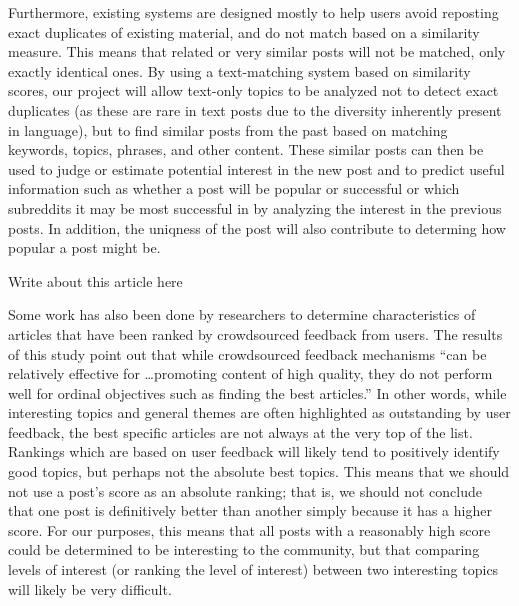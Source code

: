 \documentclass{acm_proc_article-sp}
\begin{document}
Furthermore, existing systems are designed mostly to help users avoid reposting exact duplicates of
existing material, and do not match based on a similarity measure.  This means that related or
very similar posts will not be matched, only exactly identical ones.  By using a text-matching system based
on similarity scores,
our project will allow text-only topics to be analyzed not to detect exact duplicates (as these
are rare in text posts due to the diversity inherently present in language), but to find similar
posts from the past based on matching keywords, topics, phrases, and other
content.  These similar posts can then be used to judge or estimate potential interest in the new
post and to predict useful information such as whether a post will be popular or successful or
which subreddits it may be most successful in by analyzing the interest in the previous posts. 
In addition, the uniqness of the post will also contribute to determing how popular a post might be.

Write about this article here \cite{liu:interest}

Some work has also been done by researchers to determine characteristics of articles that
have been ranked by crowdsourced feedback from users.\cite{askalidis:crowdsourced}
The results of this study point out that while crowdsourced feedback mechanisms ``can be
relatively effective for \ldots promoting content of high quality, they do not perform well
for ordinal objectives such as finding the best articles.''  In other words, while interesting
topics and general themes are often highlighted as outstanding by user feedback, the best
specific articles are not always at the very top of the list.  Rankings which are based on
user feedback will likely tend to positively identify good
topics, but perhaps not the absolute best topics.  This means that we should not use a post's
score as an absolute ranking; that is, we should not conclude that one post is definitively better
than another simply because it has a higher score.  For our purposes, this means that
all posts with a reasonably high score could be determined to be interesting to the
community, but that comparing levels of interest (or ranking the level of interest)
between two interesting topics will likely be very difficult.
\end{document}
